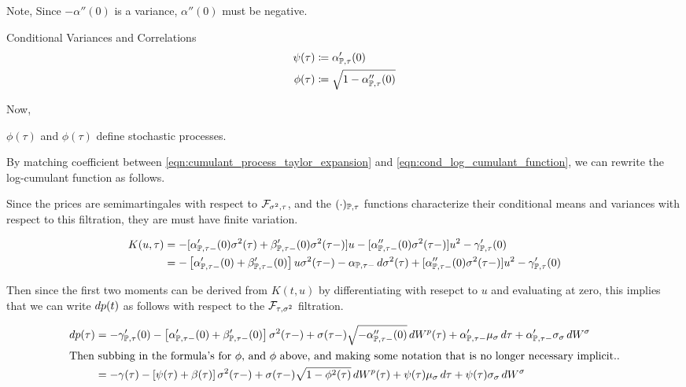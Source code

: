 \documentclass[11pt, letterpaper, twoside, final]{article}
\begin{document}
Note, Since $-\alpha''(0)$ is a variance, $\alpha''(0)$ must be negative.

\begin{defn}{Conditional Variances and Correlations} 
    \begin{align}
        \psi(\tau) &\coloneqq \alpha_{\mathbb{P}, \tau}'(0) \\
        \phi(\tau) &\coloneqq \sqrt{1 -\alpha_{\mathbb{P}, \tau}''(0)}
    \end{align}
\end{defn}

Now, 


$\phi(\tau)$ and $\phi(\tau)$ define stochastic processes.

By matching coefficient between \cref{eqn:cumulant_process_taylor_expansion} and
\cref{eqn:cond_log_cumulant_function}, we can rewrite the log-cumulant function as follows.

Since the prices are semimartingales with respect to $\mathcal{F}_{\sigma^2, \tau}$, and the $(\cdot)_{\mathbb{P},\tau}$ functions
characterize their conditional means and variances with respect to this filtration, they are must have finite
variation. 



\begin{align}
    \label{eqn:cumulant_generating_function_quadratic_approx}
    K(u, \tau) &= - [\alpha_{\mathbb{P}, \tau-}'(0)\sigma^2(\tau)  + \beta_{\mathbb{P}, \tau-}'(0)\sigma^2(\tau-)] u -
    [\alpha_{\mathbb{P}, \tau-}''(0) \sigma^2(\tau-)] u^2  - \gamma_{\mathbb{P}, \tau}'(0)  \\
    &= - \left[\alpha_{\mathbb{P}, \tau-}'(0)+ \beta_{\mathbb{P}, \tau-}'(0)\right] u \sigma^2(\tau-) - \alpha_{\mathbb{P}, \tau-} \mathop{}\!d
       \sigma^2(\tau) + [\alpha_{\mathbb{P}, \tau-}''(0) \sigma^2(\tau-)] u^2  - \gamma_{\mathbb{P}, \tau}'(0)  \\
\end{align}


Then since the first two moments can be derived from $K(t,u)$ by differentiating with resepct to $u$ and
evaluating at zero, this implies that we can write $\mathop{}\!d p(t)$ as follows with respect to the $\mathcal{F}_{\tau,
\sigma^2}$ filtration.


\begin{align}
    \label{eqn:conditional_price_process}
    \mathop{}\!d p(\tau)  &=  - \gamma_{\mathbb{P}, \tau}'(0) - \left[\alpha_{\mathbb{P}, \tau-}'(0) + \beta_{\mathbb{P}, \tau-}'(0) \right]
    \sigma^2(\tau-) + \sigma(\tau-) \sqrt{-\alpha_{\mathbb{P}, \tau-}''(0)}\mathop{}\!d W^{p}(\tau) + \alpha'_{\mathbb{P}, \tau-}
    \mu_{\sigma} \mathop{}\!d \tau + \alpha'_{\mathbb{P}, \tau-} \sigma_{\sigma} \mathop{}\!d W^{\sigma}\\
    \intertext{Then subbing in the formula's for $\phi$, and $\phi$ above, and making some notation that is no
        longer necessary implicit..}
    &=  - \gamma(\tau) - \left[\psi(\tau) + \beta(\tau) \right]
        \sigma^2(\tau-) + \sigma(\tau-) \sqrt{1 - \phi^2(\tau)}\mathop{}\!d W^{p}(\tau) + \psi(\tau) \mu_{\sigma} \mathop{}\!d
        \tau + \psi(\tau) \sigma_{\sigma} \mathop{}\!d W^{\sigma}
\end{align}
\end{document}
